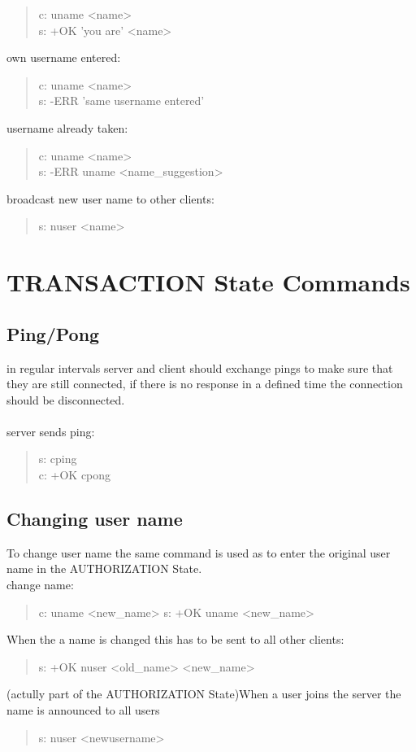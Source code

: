 \documentclass[a4paper,11pt]{article}
\begin{document}
\begin{quote}
  c: uname <name>\\
  s: +OK 'you are' <name>
\end{quote}
\noindent
own username entered:
\begin{quote}
  c: uname <name>\\
  s: -ERR 'same username entered'
\end{quote}
\noindent
username already taken:
\begin{quote}
  c: uname <name>\\
  s: -ERR uname <name\_suggestion>
\end{quote}
\noindent
broadcast new user name to other clients:
\begin{quote}
  s: nuser <name>
\end{quote}


\clearpage
\section{TRANSACTION State Commands}
\subsection{Ping/Pong}
in regular intervals server and client should exchange pings to make sure that they are still connected, if there is no response in a defined time the connection should be disconnected.\\\\
\noindent
server sends ping:
\begin{quote}
  s: cping\\
  c: +OK cpong
\end{quote}

\subsection{Changing user name}
To change user name the same command is used as to enter the original user name in the AUTHORIZATION State.\\
change name:
\begin{quote}
  c: uname <new\_name>
  s: +OK uname <new\_name>
\end{quote}
\noindent
When the a name is changed this has to be sent to all other clients:\\
\begin{quote}
  s: +OK nuser <old\_name> <new\_name>
\end{quote}
\noindent
(actully part of the AUTHORIZATION State)When a user joins the server the name is announced to all users
\begin{quote}
  s: nuser <newusername> 
\end{quote}
\end{document}
